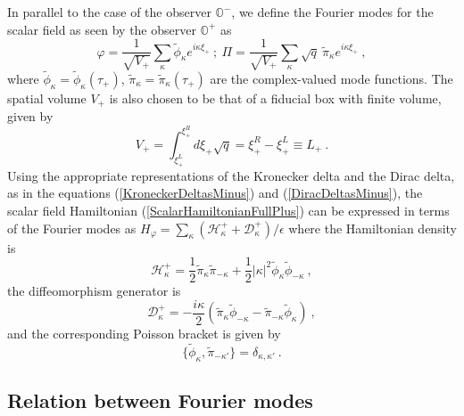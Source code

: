 \documentclass[aps,12pt,showpacs]{revtex4-2}
\def\kr{\kappa}
\def\observerminus{\mathbb{O}^{-}}
\def\observerplus{\mathbb{O}^{+}}
\begin{document}
In parallel to the case of the observer $\observerminus$, we define the 
Fourier modes for the scalar field as seen by the observer $\observerplus$
as
%
\begin{equation}\label{FourierModesDefinitionPlus}
\varphi =  \frac{1}{\sqrt{V_{+}}}\sum_{\kr} \tilde{\phi}_{\kr} 
e^{i \kr \xi_{+}} ~;~
\Pi =  \frac{1}{\sqrt{V_{+}}} \sum_{\kr} \sqrt{q}~ \tilde{\pi}_{\kr} 
e^{i \kr \xi_{+}} ~,
\end{equation}
%
where $\tilde{\phi}_{\kr} = \tilde{\phi}_{\kr} (\tau_{+})$, 
$\tilde{\pi}_{\kr} = \tilde{\pi}_{\kr} (\tau_{+})$ are the complex-valued mode 
functions. The spatial volume $V_{+}$ is also chosen to be that of a fiducial 
box with finite volume, given by
%
\begin{equation}\label{SpatialVoumePlus}
V_{+} = \int_{\xi_{+}^L}^{\xi_{+}^R} d\xi_{+}\sqrt{q} = {\xi_{+}^R} - 
{\xi_{+}^L} \equiv L_{+} ~.
\end{equation}
%
Using the appropriate representations of the Kronecker delta and the Dirac 
delta, as in the equations (\ref{KroneckerDeltasMinus}) and 
(\ref{DiracDeltasMinus}), the scalar field Hamiltonian 
(\ref{ScalarHamiltonianFullPlus}) can be expressed in terms of the Fourier 
modes 
as $H_{\varphi} = \sum_{\kr} (\mathcal{H}_{\kr}^{+} + 
\mathcal{D}_{\kr}^{+})/\epsilon$ where the Hamiltonian density is
%
\begin{equation}\label{FourierHamiltonianPlus}
\mathcal{H}_{\kr}^{+} = \frac{1}{2} \tilde{\pi}_{\kr}  \tilde{\pi}_{-\kr}
+ \frac{1}{2} |\kr|^2 \tilde{\phi}_{\kr}  \tilde{\phi}_{-\kr} ~,
\end{equation}
%
the diffeomorphism generator is
%
\begin{equation}\label{FourierDiffeomorphismPlus}
\mathcal{D}_{\kr}^{+} =  
 -\frac{i \kr}{2} \left( \tilde{\pi}_{\kr} \tilde{\phi}_{-\kr} -
 \tilde{\pi}_{-\kr} \tilde{\phi}_{\kr} \right)  ~,
\end{equation}
%
and the corresponding Poisson bracket is given by
%
\begin{equation}\label{FourierPoissonBracketPlus}
\{\tilde{\phi}_{\kr}, \tilde{\pi}_{-\kr'}\} = \delta_{\kr,\kr'} ~.
\end{equation}
%




  
\subsection{Relation between Fourier modes}
       
\end{document}
